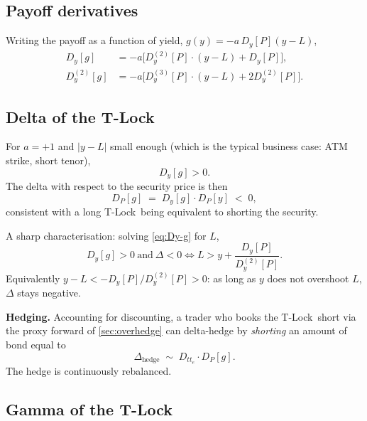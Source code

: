 \documentclass[11pt]{article}
\theoremstyle{definition}
\newcommand{\Tlock}{T-Lock}
\newcommand{\dDy}[1]{D_{y}^{(#1)}}              %
\begin{document}
\subsection{Payoff derivatives}

Writing the payoff as a function of yield, $g(y) = -a\,D_y[P](y-L)$,
\begin{align}
D_y[g] &= -a\bigl[\dDy{2}[P]\cdot(y-L) + D_y[P]\bigr],
         \label{eq:Dy-g}\\
\dDy{2}[g] &= -a\bigl[\dDy{3}[P]\cdot(y-L) + 2\dDy{2}[P]\bigr].
         \label{eq:Dyy-g}
\end{align}

\subsection{Delta of the \Tlock}

For $a=+1$ and $|y-L|$ small enough (which is the typical business case:
ATM strike, short tenor),
\begin{equation}
D_y[g] > 0.
\label{eq:delta-y}
\end{equation}
The delta with respect to the security price is then
\begin{equation}
D_P[g] \;=\; D_y[g]\cdot D_P[y] \;<\; 0,
\label{eq:delta-P}
\end{equation}
consistent with a long \Tlock\ being equivalent to shorting the
security.

A sharp characterisation: solving \cref{eq:Dy-g} for $L$,
\begin{equation}
D_y[g]>0\ \text{and}\ \Delta<0
\iff
L > y + \frac{D_y[P]}{\dDy{2}[P]}.
\label{eq:delta-sign}
\end{equation}
Equivalently $y - L < -D_y[P]/\dDy{2}[P] > 0$: as long as $y$ does not
overshoot $L$, $\Delta$ stays negative.

\textbf{Hedging.} Accounting for discounting, a trader who books the
\Tlock\ short via the proxy forward of \cref{sec:overhedge} can
delta-hedge by \emph{shorting} an amount of bond equal to
\begin{equation}
\Delta_{\text{hedge}} \;\sim\; D_{t t_e}\cdot D_P[g].
\label{eq:delta-hedge}
\end{equation}
The hedge is continuously rebalanced.

\subsection{Gamma of the \Tlock}\label{sec:gamma}
\end{document}
